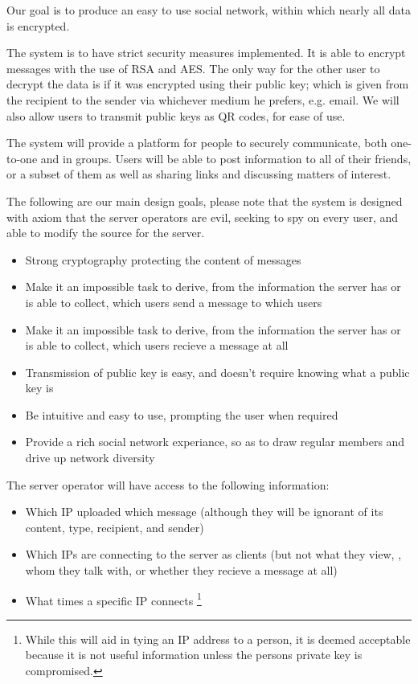 Our goal is to produce an easy to use social network, within which nearly all
data is encrypted.

The system is to have strict security measures implemented. It is able to
encrypt messages with the use of RSA and AES. The only way for the other user to
decrypt the data is if it was encrypted using their public key; which is given
from the recipient to the sender via whichever medium he prefers, e.g. email.
We will also allow users to transmit public keys as QR codes, for ease of use.

The system will provide a platform for people to securely communicate, both
one-to-one and in groups. Users will be able to post information to all of their
friends, or a subset of them as well as sharing links and discussing matters of
interest.

The following are our main design goals, please note that the system is designed
with axiom that the server operators are evil, seeking to spy on every user, and
able to modify the source for the server.
\begin{itemize}
\item Strong cryptography protecting the content of messages
\item Make it an impossible task to derive, from the information the server has
      or is able to collect, which users send a message to which users
\item Make it an impossible task to derive, from the information the server has
      or is able to collect, which users recieve a message at all
\item Transmission of public key is easy, and doesn't require knowing what a
      public key is
\item Be intuitive and easy to use, prompting the user when required
\item Provide a rich social network experiance, so as to draw regular members
      and drive up network diversity
\end{itemize}

The server operator will have access to the following information:
\begin{itemize}
\item Which IP uploaded which message (although they will be ignorant of its
content, type, recipient, and sender)
\item Which IPs are connecting to the server as clients (but not what they view,
      , whom they talk with, or whether they recieve a message at all)
\item What times a specific IP connects \footnote {While this will aid in tying
an IP address to a person, it is deemed acceptable because it is not useful
information unless the persons private key is compromised.}
\end{itemize}

